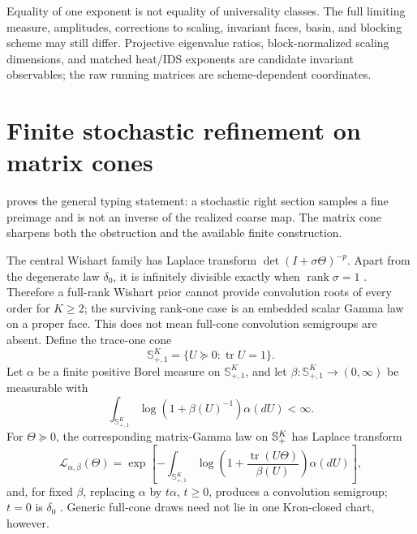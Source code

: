 Equality of one exponent is not equality of universality classes.  The full
limiting measure, amplitudes, corrections to scaling, invariant faces,
basin, and blocking scheme may still differ.  Projective eigenvalue ratios,
block-normalized scaling dimensions, and matched heat/IDS exponents are
candidate invariant observables; the raw running matrices are
scheme-dependent coordinates.

\section{Finite stochastic refinement on matrix cones}
\label{sec:grg-stochastic-refinement}

 proves the general typing statement:
a stochastic right section samples a fine preimage and is not an inverse of
the realized coarse map.  The matrix cone sharpens both the obstruction and
the available finite construction.

The central Wishart family has Laplace transform
\(\det(I+\sigma\Theta)^{-p}\). Apart from the degenerate law
\(\delta_0\), it is infinitely divisible exactly when
\(\operatorname{rank}\sigma=1\) \citep{Mayerhofer2010Wishart}. Therefore a
full-rank Wishart prior cannot provide convolution roots of every order for
\(K\geq2\); the surviving rank-one case is an embedded scalar Gamma law on
a proper face.  This does not mean full-cone convolution semigroups are
absent. Define the trace-one cone
\[
\mathbb S_{+,1}^K
=\{U\succeq0:\operatorname{tr}U=1\}.
\]
Let \(\alpha\) be a finite positive Borel measure on
\(\mathbb S_{+,1}^K\), and let
\(\beta:\mathbb S_{+,1}^K\to(0,\infty)\) be measurable with
\[
\int_{\mathbb S_{+,1}^K}
\log\left(1+\beta(U)^{-1}\right)\alpha(dU)<\infty.
\]
For \(\Theta\succeq0\), the corresponding matrix-Gamma law on
\(\mathbb S_{+}^K\) has Laplace transform
\begin{equation}
\mathcal L_{\alpha,\beta}(\Theta)
=\exp\left[
-\int_{\mathbb S_{+,1}^K}
\log\left(
1+\frac{\operatorname{tr}(U\Theta)}{\beta(U)}
\right)\alpha(dU)
\right],
\label{eq:grg-matrix-gamma}
\end{equation}
and, for fixed \(\beta\), replacing \(\alpha\) by \(t\alpha\), \(t\geq0\),
produces a convolution semigroup; \(t=0\) is \(\delta_0\)
\citep{PerezAbreuStelzer2014}. Generic full-cone draws need not lie in one
Kron-closed chart, however.

